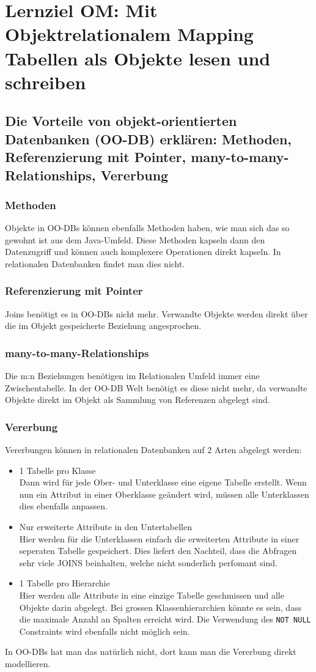 \section{Lernziel OM: Mit Objektrelationalem Mapping Tabellen als Objekte lesen und schreiben}

\subsection{Die Vorteile von objekt-orientierten Datenbanken (OO-DB) erklären: Methoden, Referenzierung mit Pointer, many-to-many-Relationships, Vererbung}
\subsubsection{Methoden}
Objekte in OO-DBs können ebenfalls Methoden haben, wie man sich das so gewohnt ist aus dem Java-Umfeld. Diese Methoden kapseln dann den Datenzugriff und können auch komplexere Operationen direkt kapseln. In relationalen Datenbanken findet man dies nicht.
\subsubsection{Referenzierung mit Pointer}
Joins benötigt es in OO-DBs nicht mehr. Verwandte Objekte werden direkt über die im Objekt gespeicherte Beziehung angesprochen.
\subsubsection{many-to-many-Relationships}
Die m:n Beziehungen benötigen im Relationalen Umfeld immer eine Zwischentabelle. In der OO-DB Welt benötigt es diese nicht mehr, da verwandte Objekte direkt im Objekt als Sammlung von Referenzen abgelegt sind.
\subsubsection{Vererbung}
Vererbungen können in relationalen Datenbanken auf 2 Arten abgelegt werden:
\begin{itemize}
  \item 1 Tabelle pro Klasse \\
  Dann wird für jede Ober- und Unterklasse eine eigene Tabelle erstellt. Wenn nun ein Attribut in einer Oberklasse geändert wird, müssen alle Unterklassen dies ebenfalls anpassen.
  \item Nur erweiterte Attribute in den Untertabellen \\
  Hier werden für die Unterklassen einfach die erweiterten Attribute in einer seperaten Tabelle gespeichert. Dies liefert den Nachteil, dass die Abfragen sehr viele JOINS beinhalten, welche nicht sonderlich perfomant sind.
  \item 1 Tabelle pro Hierarchie \\
  Hier werden alle Attribute in eine einzige Tabelle geschmissen und alle Objekte darin abgelegt. Bei grossen Klassenhierarchien könnte es sein, dass die maximale Anzahl an Spalten erreicht wird. Die Verwendung des \texttt{NOT NULL} Constraints wird ebenfalls nicht möglich sein.
\end{itemize}
In OO-DBs hat man das natürlich nicht, dort kann man die Vererbung direkt modellieren.
